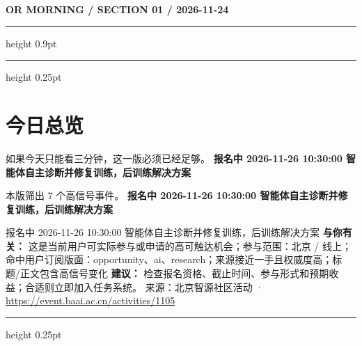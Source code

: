 \documentclass[10.5pt]{ctexart}
\begin{document}
{\small\bfseries OR MORNING / SECTION 01 / 2026-11-24}
\vspace{2mm}
\hrule height 0.9pt
\vspace{1.5mm}
\hrule height 0.25pt
\vspace{4mm}
\section*{今日总览}
{\color{ormuted} 如果今天只能看三分钟，这一版必须已经足够。}
\vspace{2mm}
{\fontsize{25}{29}\selectfont\bfseries 报名中 2026-11-26 10:30:00 智能体自主诊断并修复训练，后训练解决方案}\par
\vspace{2mm}
{\large 本版筛出 7 个高信号事件。}
\vspace{3mm}
{\Large\bfseries 报名中 2026-11-26 10:30:00 智能体自主诊断并修复训练，后训练解决方案}\par
报名中 2026-11-26 10:30:00 智能体自主诊断并修复训练，后训练解决方案
\textbf{与你有关：} 这是当前用户可实际参与或申请的高可触达机会；参与范围：北京 / 线上；命中用户订阅版面：opportunity、ai、research；来源接近一手且权威度高；标题/正文包含高信号变化
\textbf{建议：} 检查报名资格、截止时间、参与形式和预期收益；合适则立即加入任务系统。
{\footnotesize\color{ormuted} 来源：北京智源社区活动 · \url{https://event.baai.ac.cn/activities/1105}}
\vspace{3mm}
\hrule height 0.25pt
\vspace{3mm}
\end{document}
